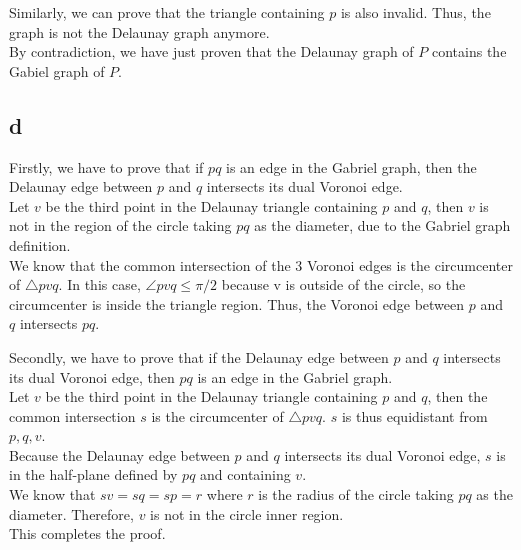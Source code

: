 Similarly, we can prove that the triangle containing $p$ is also invalid. Thus, the graph is not the Delaunay graph anymore. \\

By contradiction, we have just proven that the Delaunay graph of $P$ contains the Gabiel graph of $P$.

\subsection*{d}

Firstly, we have to prove that if $pq$ is an edge in the Gabriel graph, then the Delaunay edge between $p$ and $q$ intersects its dual Voronoi edge.\\

Let $v$ be the third point in the Delaunay triangle containing $p$ and $q$, then $v$ is not in the region of the circle taking $pq$ as the diameter, due to the Gabriel graph definition. \\

We know that the common intersection of the 3 Voronoi edges is the circumcenter of $\bigtriangleup pvq$. In this case, $\angle pvq \leq \pi / 2$ because v is outside of the circle, so the circumcenter is inside the triangle region. Thus, the Voronoi edge between $p$ and $q$ intersects $pq$.

Secondly, we have to prove that if the Delaunay edge between $p$ and $q$ intersects its dual Voronoi edge, then $pq$ is an edge in the Gabriel graph. \\

Let $v$ be the third point in the Delaunay triangle containing $p$ and $q$, then the common intersection $s$ is the circumcenter of $\bigtriangleup pvq$. $s$ is thus equidistant from $p, q, v$. \\

Because the Delaunay edge between $p$ and $q$ intersects its dual Voronoi edge, $s$ is in the half-plane defined by $pq$ and containing $v$. \\

We know that $sv = sq = sp = r$ where $r$ is the radius of the circle taking $pq$ as the diameter. Therefore, $v$ is not in the circle inner region.\\

This completes the proof.

